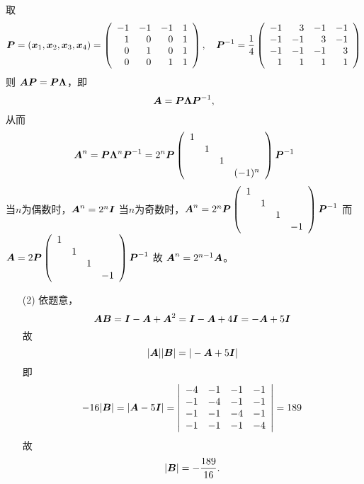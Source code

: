 \begin{frame}

  取
  $$
  \boldsymbol{P}=({\boldsymbol{x}}_1,{\boldsymbol{x}}_2,{\boldsymbol{x}}_3,{\boldsymbol{x}}_4)=\left(
  \begin{array}{rrrr}
    -1 & -1& -1&  1 \\
    1  &  0&  0&  1 \\
    0  &  1&  0&  1  \\
    0  &  0&  1&  1 
  \end{array}
  \right), ~~~\boldsymbol{P}^{-1}=\frac14 \left(
  \begin{array}{rrrr}
    -1 &   3& -1&  -1 \\
    -1 &  -1&  3&  -1 \\
    -1 &  -1& -1&   3  \\
     1 &   1&  1&   1 
  \end{array}
  \right)
  $$
  则 $\boldsymbol{A}\boldsymbol{P}=\boldsymbol{P}\mathbf{\Lambda}$，即
  $$
  \boldsymbol{A}=\boldsymbol{P}\mathbf{\Lambda}\boldsymbol{P}^{-1},
  $$
  从而$$
  \boldsymbol{A}^{n}=\boldsymbol{P}\mathbf{\Lambda}^n\boldsymbol{P}^{-1}
  =2^n \boldsymbol{P}\left(
  \begin{array}{cccc}
    1&&&\\
    &1&&\\
    &&1&\\
    &&&(-1)^n
  \end{array}
  \right)\boldsymbol{P}^{-1}
  $$
  当$n$为偶数时，$\boldsymbol{A}^n=2^n \boldsymbol{I}$
  当$n$为奇数时，$\boldsymbol{A}^n=2^n\boldsymbol{P}\left(
  \begin{array}{cccc}
    1&&&\\
    &1&&\\
    &&1&\\
    &&&-1
  \end{array}
  \right)\boldsymbol{P}^{-1} $
  而
  $
  \boldsymbol{A}=2\boldsymbol{P}\left(
  \begin{array}{cccc}
    1&&&\\
    &1&&\\
    &&1&\\
    &&&-1
  \end{array}
  \right)\boldsymbol{P}^{-1} 
  $
  故
  $
  \boldsymbol{A}^n=2^{n-1}\boldsymbol{A}
  $。

\end{frame}

\begin{frame}

  \begin{itemize}
  \item[(2)]
    依题意，
    $$
    \boldsymbol{A}\boldsymbol{B}=\boldsymbol{I}-\boldsymbol{A}+\boldsymbol{A}^2=\boldsymbol{I}-\boldsymbol{A}+4\boldsymbol{I}=-\boldsymbol{A}+5\boldsymbol{I}
    $$
    故
    $$
    |\boldsymbol{A}||\boldsymbol{B}|=|-\boldsymbol{A}+5\boldsymbol{I}|
    $$
    即
    $$
    -16 |\boldsymbol{B}| = |\boldsymbol{A}-5\boldsymbol{I}| =\left|
    \begin{array}{rrrr}
      -4&-1&-1&-1\\
      -1&-4&-1&-1\\
      -1&-1&-4&-1\\
      -1&-1&-1&-4
    \end{array}
    \right| = 189
    $$
    故
    $$
    |\boldsymbol{B}|=-\frac{189}{16}.
    $$
  \end{itemize}

\end{frame}
